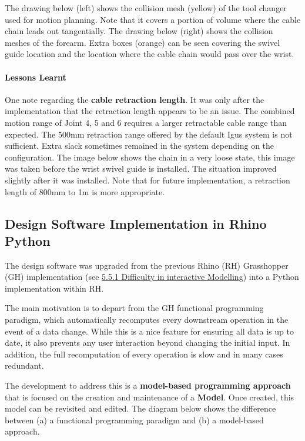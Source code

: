 The drawing below (left) shows the collision mesh (yellow) of the tool changer used for motion planning. Note that it covers a portion of volume where the cable chain leads out tangentially. The drawing below (right) shows the collision meshes of the forearm. Extra boxes (orange) can be seen covering the swivel guide location and the location where the cable chain would pass over the wrist.



\paragraph{Lessons Learnt}

One note regarding the \textbf{cable retraction length}. It was only after the implementation that the retraction length appears to be an issue. The combined motion range of Joint 4, 5 and 6 requires a larger retractable cable range than expected. The 500mm retraction range offered by the default Igus system is not sufficient. Extra slack sometimes remained in the system depending on the configuration. The image below shows the chain in a very loose state, this image was taken before the wrist swivel guide is installed. The situation improved slightly after it was installed. Note that for future implementation, a retraction length of 800mm to 1m is more appropriate.



\subsection{Design Software Implementation in Rhino Python}

The design software was upgraded from the previous Rhino (RH) Grasshopper (GH) implementation (see \ul{5.5.1 Difficulty in interactive Modelling}) into a Python implementation within RH.

The main motivation is to depart from the GH functional programming paradigm, which automatically recomputes every downstream operation in the event of a data change. While this is a nice feature for ensuring all data is up to date, it also prevents any user interaction beyond changing the initial input. In addition, the full recomputation of every operation is slow and in many cases redundant.

The development to address this is a \textbf{model-based programming approach} that is focused on the creation and maintenance of a \textbf{Model}. Once created, this model can be revisited and edited. The diagram below shows the difference between (a) a functional programming paradigm and (b) a model-based approach.

